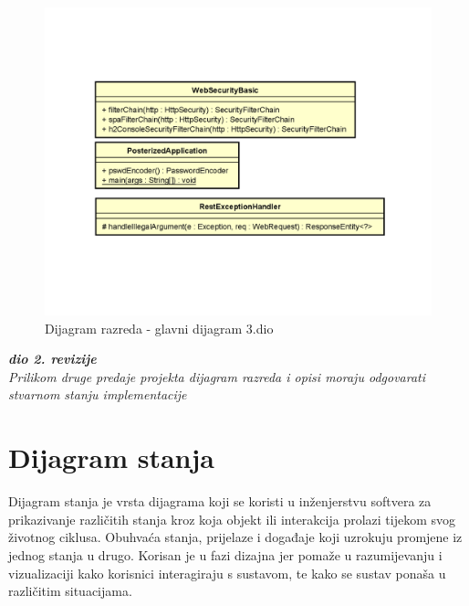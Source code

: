 			\begin{figure}[H]
				\includegraphics[scale=0.5]{dijagrami/glavni_3.png}%
				\centering
				\caption{Dijagram razreda - glavni dijagram 3.dio}
				\label{fig:promjena9.3}
			\end{figure}
			\eject



			\textbf{\textit{dio 2. revizije}}\\			
			
			\textit{Prilikom druge predaje projekta dijagram razreda i opisi moraju odgovarati stvarnom stanju implementacije}
			
			
			
			\eject
		
		\section{Dijagram stanja}
			
			

			Dijagram stanja je vrsta dijagrama koji se koristi u inženjerstvu softvera za prikazivanje različitih stanja kroz koja objekt ili interakcija prolazi tijekom svog životnog ciklusa. Obuhvaća stanja, prijelaze i događaje koji uzrokuju promjene iz jednog stanja u drugo. Korisan je u fazi dizajna jer pomaže u razumijevanju i vizualizaciji kako korisnici interagiraju s sustavom, te kako se sustav ponaša u različitim situacijama.
			
